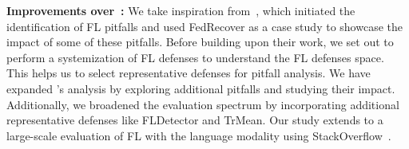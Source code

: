 \noindent\textbf{Improvements over~\cite{khan2023pitfalls}:} We take inspiration from~\cite{khan2023pitfalls}, which initiated the identification of FL pitfalls and used FedRecover as a case study to showcase the impact of some of these pitfalls. Before building upon their work, we set out to perform a systemization of FL defenses to understand the FL defenses space. This helps us to select representative defenses for pitfall analysis. We have expanded \cite{khan2023pitfalls}'s analysis by exploring additional pitfalls and studying their impact. Additionally, we broadened the evaluation spectrum by incorporating additional representative defenses like FLDetector and TrMean. Our study extends to a large-scale evaluation of FL with the language modality using StackOverflow~\cite{stackoverflow2019}.